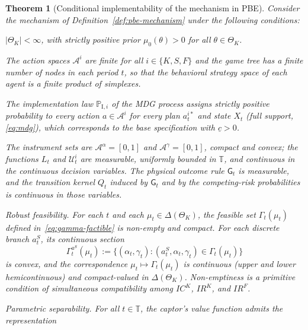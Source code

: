 \documentclass[ecta,nameyear,draft]{econsocart}
\theoremstyle{plain}
\newtheorem{theorem}{Theorem}
\theoremstyle{definition}
\newcommand{\ThetaK}{\Theta_K}
\newcommand{\1}{\mathbf{1}}
\newcommand{\ProbI}[1]{\mathbb{P}_{\mathrm{I},#1}}
\begin{document}
\begin{theorem}[Conditional implementability of the mechanism in PBE]\label{thm:ebp-implementabilidad}
\normalfont
Consider the mechanism of Definition~\ref{def:pbe-mechanism} under the following conditions:
\begin{list}{}{\setlength{\labelwidth}{2.6em}\setlength{\labelsep}{0.7em}\setlength{\leftmargin}{3.3em}\setlength{\itemindent}{0pt}\setlength{\listparindent}{0pt}\setlength{\parsep}{0pt}\setlength{\itemsep}{0.35\baselineskip}}
  \item[\textup{(i)}] $|\ThetaK|<\infty$, with strictly positive prior $\mu_0(\theta)>0$ for all $\theta\in\ThetaK$.
  \item[\textup{(ii)}] The action spaces $\mathcal{A}^i$ are finite for all $i\in\{K,S,F\}$ and the game tree has a finite number of nodes in each period $t$, so that the behavioral strategy space of each agent is a finite product of simplexes.
  \item[\textup{(iii)}] The implementation law $\ProbI{i}$ of the MDG process assigns strictly positive probability to every action $a\in\mathcal{A}^i$ for every plan $a_t^{i\ast}$ and state $X_t$ \textup{(}full support, \eqref{eq:mdg}\textup{)}, which corresponds to the base specification with $\underline{c}>0$.
  \item[\textup{(iv)}] The instrument sets are $\mathcal{A}^{\alpha}=[0,1]$ and $\mathcal{A}^{\gamma}=[0,1]$, compact and convex; the functions $L_t$ and $\mathcal{U}_t^i$ are measurable, uniformly bounded in $\mathbb{T}$, and continuous in the continuous decision variables. The physical outcome rule $\mathsf{G}_t$ is measurable, and the transition kernel $Q_t$ induced by $\mathsf{G}_t$ and by the competing-risk probabilities is continuous in those variables.
  \item[\textup{(v)}] Robust feasibility. For each $t$ and each $\mu_t\in\Delta(\ThetaK)$, the feasible set $\Gamma_t(\mu_t)$ defined in~\eqref{eq:gamma-factible} is non-empty and compact. For each discrete branch $a_t^S$, its continuous section
  \[
  \Gamma_t^{a^S}(\mu_t):=\{(\alpha_t,\gamma_t):(a_t^S,\alpha_t,\gamma_t)\in\Gamma_t(\mu_t)\}
  \]
  is convex, and the correspondence $\mu_t\mapsto\Gamma_t(\mu_t)$ is continuous \textup{(}upper and lower hemicontinuous\textup{)} and compact-valued in $\Delta(\ThetaK)$. Non-emptiness is a primitive condition of simultaneous compatibility among $IC^K$, $IR^K$, and $IR^F$.
  \item[\textup{(vi)}] Parametric separability. For all $t\in\mathbb{T}$, the captor's value function admits the representation

\end{list}
\end{theorem}
\end{document}
